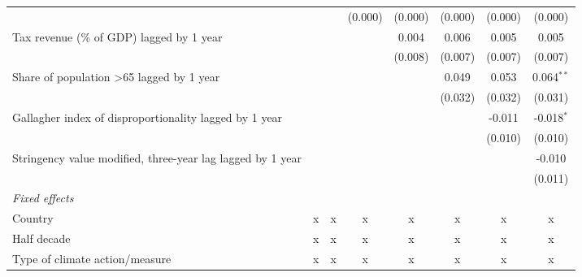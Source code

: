 \begin{tabular}{lccccccc}
                                                                               &               &               & (0.000)       & (0.000)       & (0.000)      & (0.000)      & (0.000)\\   
   Tax revenue (\% of GDP) lagged by 1 year                                    &               &               &               & 0.004         & 0.006        & 0.005        & 0.005\\   
                                                                               &               &               &               & (0.008)       & (0.007)      & (0.007)      & (0.007)\\   
   Share of population >65 lagged by 1 year                                    &               &               &               &               & 0.049        & 0.053        & 0.064$^{**}$\\   
                                                                               &               &               &               &               & (0.032)      & (0.032)      & (0.031)\\   
   Gallagher index of disproportionality lagged by 1 year                      &               &               &               &               &              & -0.011       & -0.018$^{*}$\\   
                                                                               &               &               &               &               &              & (0.010)      & (0.010)\\   
   Stringency value modified, three-year lag lagged by 1 year                  &               &               &               &               &              &              & -0.010\\   
                                                                               &               &               &               &               &              &              & (0.011)\\   
   \emph{Fixed effects}\\
   Country                                                                     & x             & x             & x             & x             & x            & x            & x\\  
   Half decade                                                                 & x             & x             & x             & x             & x            & x            & x\\  
   Type of climate action/measure                                              & x             & x             & x             & x             & x            & x            & x\\  

\end{tabular}

